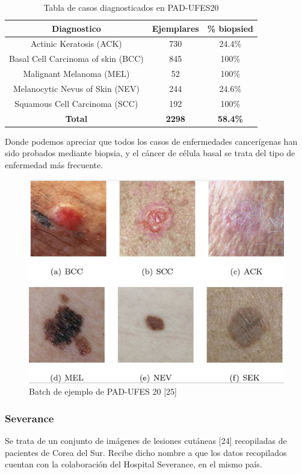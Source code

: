 \begin{table}[!ht]
	\centering
	\begin{tabular}{|c|c|c|}
		\hline
		\textbf{Diagnostico} & \textbf{Ejemplares} & \textbf{\% biopsied} \\ \hline
		Actinic Keratosis (ACK) & 730 & 24.4\% \\ \hline
		Basal Cell Carcinoma of skin (BCC) & 845 & 100\% \\ \hline
		Malignant Melanoma (MEL) & 52 & 100\% \\ \hline
		Melanocytic Nevus of Skin (NEV) & 244 & 24.6\% \\ \hline
		Squamous Cell Carcinoma (SCC) & 192 & 100\% \\ \hline
		\textbf{Total} & \textbf{2298} & \textbf{58.4\%} \\ \hline
	\end{tabular}
	\caption{Tabla de casos diagnosticados en PAD-UFES20}
\end{table}

Donde podemos apreciar que todos los casos de enfermedades cancerígenas han sido probados mediante biopsia, y el cáncer de célula basal se trata del tipo de enfermedad más frecuente.

\begin{figure}[H]
	\centering
	\includegraphics[scale = 0.45]{imagenes/PAD-UFES.png}
	\caption{Batch de ejemplo de PAD-UFES 20 [25]}
\end{figure}

\subsubsection{Severance}
Se trata de un conjunto de imágenes de lesiones cutáneas [24] recopiladas de pacientes de Corea del Sur. Recibe dicho nombre a que los datos recopilados cuentan con la colaboración del Hospital Severance, en el mismo país. \\


